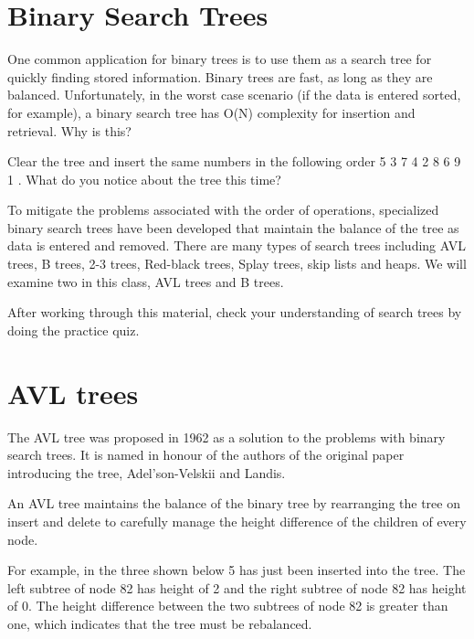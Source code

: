 \section{Binary Search Trees}

One common application for binary trees is to use them as a search tree for quickly finding stored information. Binary trees are fast, as long as they are balanced. Unfortunately, in the worst case scenario (if the data is entered sorted, for example), a binary search tree has O(N) complexity for insertion and retrieval. Why is this?


Clear the tree and insert the same numbers in the following order 5 3 7 4 2 8 6 9 1 . What do you notice about the tree this time?

To mitigate the problems associated with the order of operations, specialized binary search trees have been developed that maintain the balance of the tree as data is entered and removed. There are many types of search trees including AVL trees, B trees, 2-3 trees, Red-black trees, Splay trees, skip lists and heaps. We will examine two in this class, AVL trees and B trees.

After working through this material, check your understanding of search trees by doing the practice quiz.

\section{AVL trees}

The AVL tree was proposed in 1962 as a solution to the problems with binary search trees. It is named in honour of the authors of the original paper introducing the tree, Adel'son-Velskii and Landis.

An AVL tree maintains the balance of the binary tree by rearranging the tree on insert and delete to carefully manage the height difference of the children of every node.

For example, in the three shown below 5 has just been inserted into the tree. The left subtree of node 82 has height of 2 and the right subtree of node 82 has height of 0. The height difference between the two subtrees of node 82 is greater than one, which indicates that the tree must be rebalanced.

